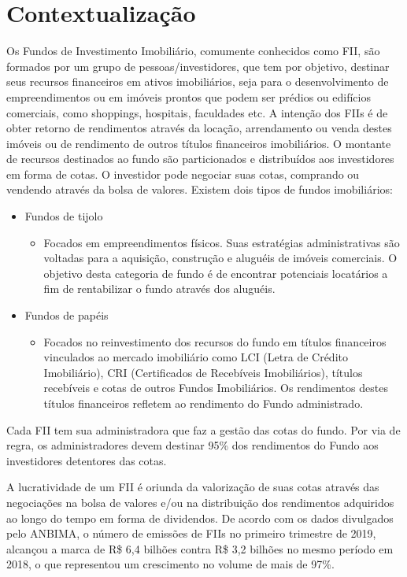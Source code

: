 \label{chap:introduction}

\section{Contextualização}

Os Fundos de Investimento Imobiliário, comumente conhecidos como FII, são formados por um grupo de pessoas/investidores, que tem por objetivo, destinar seus recursos financeiros em ativos imobiliários, seja para o desenvolvimento de empreendimentos ou em imóveis prontos que podem ser prédios ou edifícios comerciais, como shoppings, hospitais, faculdades etc. A intenção dos FIIs é de obter retorno de rendimentos através da locação, arrendamento ou venda destes imóveis ou de rendimento de outros títulos financeiros imobiliários. O montante de recursos destinados ao fundo são particionados e distribuídos aos investidores em forma de cotas. O investidor pode negociar suas cotas, comprando ou vendendo através da bolsa de valores.
Existem dois tipos de fundos imobiliários:

\begin{itemize}
  \item Fundos de tijolo
    \begin{itemize}
      \item Focados em empreendimentos físicos. Suas estratégias administrativas são voltadas para a aquisição, construção e aluguéis de imóveis comerciais. O objetivo desta categoria de fundo é de encontrar potenciais locatários a fim de rentabilizar o fundo através dos aluguéis. 
    \end{itemize}
  \item Fundos de papéis
  \begin{itemize}
    \item Focados no reinvestimento dos recursos do fundo em títulos financeiros vinculados ao mercado imobiliário como LCI (Letra de Crédito Imobiliário), CRI (Certificados de Recebíveis Imobiliários), títulos recebíveis e cotas de outros Fundos Imobiliários. Os rendimentos destes títulos financeiros refletem ao rendimento do Fundo administrado.
  \end{itemize}
\end{itemize}

Cada FII tem sua administradora que faz a gestão das cotas do fundo. Por via de regra, os administradores devem destinar 95\% dos rendimentos do Fundo aos investidores detentores das cotas.

A lucratividade de um FII é oriunda da valorização de suas cotas através das negociações na bolsa de valores  e/ou na distribuição dos rendimentos adquiridos ao longo do tempo em forma de dividendos.
De acordo com os dados divulgados pelo ANBIMA, o número de emissões de FIIs no primeiro trimestre de 2019, alcançou a marca de R\$ 6,4 bilhões contra R\$ 3,2 bilhões no mesmo período em 2018, o que representou um crescimento no volume de mais de 97\%. 

